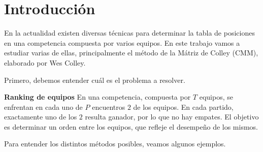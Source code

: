 \section{Introducción}

En la actualidad existen diversas técnicas para determinar la tabla de posiciones en una competencia compuesta por varios equipos. En este trabajo vamos a estudiar varias de ellas, principalmente el método de la Mátriz de Colley (CMM), elaborado por Wes Colley.

Primero, debemos entender cuál es el problema a resolver.

\noindent \textbf{Ranking de equipos} En una competencia, compuesta por $T$ equipos, se enfrentan en cada uno de $P$ encuentros $2$ de los equipos. En cada partido, exactamente uno de los $2$ resulta ganador, por lo que no hay empates. El objetivo es determinar un orden entre los equipos, que refleje el desempeño de los mismos.

Para entender los distintos métodos posibles, veamos algunos ejemplos.

